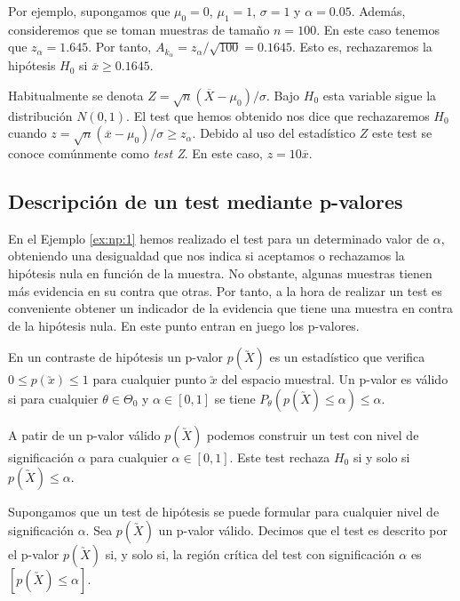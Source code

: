 \begin{ex}
            Por ejemplo, supongamos que $\mu_0 = 0$, $\mu_1 = 1$, $\sigma = 1$ y $\alpha = 0.05$. Además, consideremos que se toman muestras de tamaño $n = 100$. En este caso tenemos que $z_\alpha = 1.645$. Por tanto, $A_{k_\alpha} = z_\alpha / \sqrt{100} = 0.1645$. Esto es, rechazaremos la hipótesis $H_0$ si $\overline{x} \ge 0.1645$.

            Habitualmente se denota $Z = \sqrt{n} (\overline{X} - \mu_0) / \sigma$. Bajo $H_0$ esta variable sigue la distribución $N(0,1)$. El test que hemos obtenido nos dice que rechazaremos $H_0$ cuando $z = \sqrt{n} (\overline{x} - \mu_0) / \sigma \ge z_\alpha$. Debido al uso del estadístico $Z$ este test se conoce comúnmente como \emph{test Z}. En este caso, $z = 10 \overline{x}$.
        \end{ex}


    \subsection{Descripción de un test mediante p-valores}

        En el Ejemplo \ref{ex:np:1} hemos realizado el test para un determinado valor de $\alpha$, obteniendo una desigualdad que nos indica si aceptamos o rechazamos la hipótesis nula en función de la muestra. No obstante, algunas muestras tienen más evidencia en su contra que otras. %
        Por tanto, a la hora de realizar un test es conveniente obtener un indicador de la evidencia que tiene una muestra en contra de la hipótesis nula. En este punto entran en juego los p-valores.

        \begin{definition}
            En un contraste de hipótesis un p-valor $p(\utilde{X})$ es un estadístico que verifica $0 \le p(\utilde{x}) \le 1$ para cualquier punto $\utilde{x}$ del espacio muestral. Un p-valor es válido si para cualquier $\theta \in \Theta_0$ y $\alpha \in [0,1]$ se tiene $P_\theta(p(\utilde{X}) \le \alpha) \le \alpha.$
        \end{definition}

        A patir de un p-valor válido $p(\utilde{X})$ podemos construir un test con nivel de significación $\alpha$ para cualquier $\alpha \in [0,1]$. Este test rechaza $H_0$ si y solo si $p(\utilde{X}) \le \alpha$.

        \begin{definition}
            Supongamos que un test de hipótesis se puede formular para cualquier nivel de significación $\alpha$. Sea $p(\utilde{X})$ un p-valor válido. Decimos que el test es descrito por el p-valor $p(\utilde{X})$ si, y solo si, la región crítica del test con significación $\alpha$ es $\left[p(\utilde{X}) \le \alpha\right]$.
        \end{definition}

